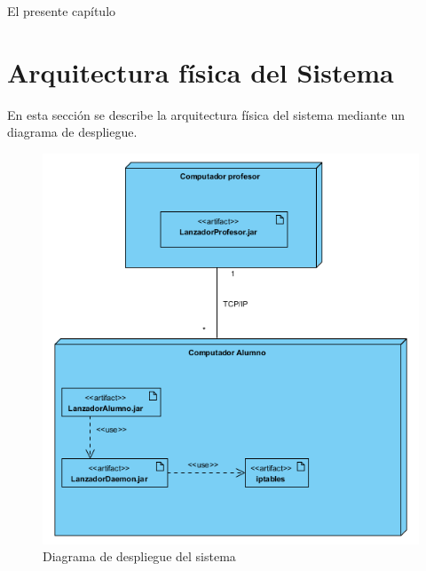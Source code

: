 

\label{chap:arquitectura}

El presente capítulo 

\chaptertoc

\section{Arquitectura física del Sistema}
\label{sec:arquitectura:arqFisica}

En esta sección se describe la arquitectura física del sistema mediante un diagrama de despliegue.
\begin{figure}
    \centering
    \includegraphics{arquitectura/despliegueSistema}
    \caption{Diagrama de despliegue del sistema}
    \label{fig:arquitectura:despliegueSistema}
\end{figure}
\newline


